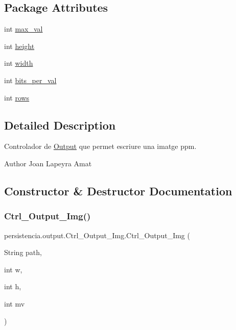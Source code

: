 \subsection*{Package Attributes}
\begin{DoxyCompactItemize}
\item 
int \hyperlink{classpersistencia_1_1output_1_1Ctrl__Output__Img_ab9e685dae026afe43188c62d7c4fad53}{max\+\_\+val}
\item 
int \hyperlink{classpersistencia_1_1output_1_1Ctrl__Output__Img_a1d7bc52c64c79e8545ae6d1ae8b9ee2e}{height}
\item 
int \hyperlink{classpersistencia_1_1output_1_1Ctrl__Output__Img_ae4a01ec459078cece4815d2fe7db8a64}{width}
\item 
int \hyperlink{classpersistencia_1_1output_1_1Ctrl__Output__Img_ad40e63d16abd9058889249f5ad84f200}{bits\+\_\+per\+\_\+val}
\item 
int \hyperlink{classpersistencia_1_1output_1_1Ctrl__Output__Img_a586ee8128a26b6786471e040a705bdbc}{rows}
\end{DoxyCompactItemize}


\subsection{Detailed Description}
Controlador de \hyperlink{classpersistencia_1_1output_1_1Output}{Output} que permet escriure una imatge ppm. 

\begin{DoxyAuthor}{Author}
Joan Lapeyra Amat 
\end{DoxyAuthor}


\subsection{Constructor \& Destructor Documentation}
\mbox{\label{classpersistencia_1_1output_1_1Ctrl__Output__Img_aa3f2948dd4645d8b121eedf30daa0c3f}} 
\subsubsection{\texorpdfstring{Ctrl\+\_\+\+Output\+\_\+\+Img()}{Ctrl\_Output\_Img()}}
{\footnotesize\ttfamily persistencia.\+output.\+Ctrl\+\_\+\+Output\+\_\+\+Img.\+Ctrl\+\_\+\+Output\+\_\+\+Img (\begin{DoxyParamCaption}\item[{String}]{path,  }\item[{int}]{w,  }\item[{int}]{h,  }\item[{int}]{mv }\end{DoxyParamCaption})\hspace{0.3cm}{\ttfamily [inline]}}



